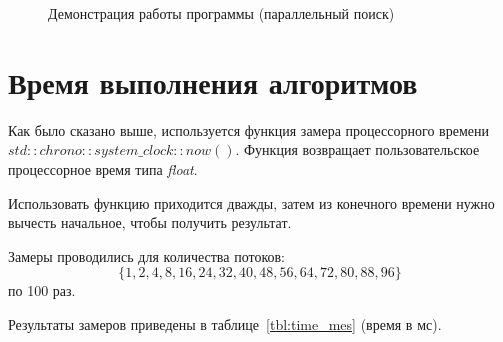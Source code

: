 \begin{figure}[H]
	\caption{Демонстрация работы программы (параллельный поиск)}
	\label{img:demPar}
\end{figure}

\section{Время выполнения алгоритмов}

Как было сказано выше, используется функция замера процессорного времени $std::chrono::system\_clock::now()$. Функция возвращает пользовательское процессорное время типа \textit{float}.

Использовать функцию приходится дважды, затем из конечного времени нужно вычесть начальное, чтобы получить результат.

Замеры проводились для количества потоков: $$\{1, 2, 4, 8, 16, 24, 32, 40, 48, 56, 64, 72, 80, 88, 96\}$$ по 100 раз.

Результаты замеров приведены в таблице~\ref{tbl:time_mes} (время в мс).

